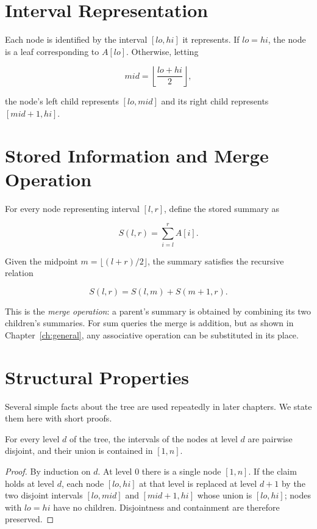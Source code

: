 \section{Interval Representation}
Each node is identified by the interval $[lo, hi]$ it represents. If $lo = hi$, the node is a leaf corresponding to $A[lo]$. Otherwise, letting

\begin{equation}
mid = \left\lfloor \frac{lo+hi}{2} \right\rfloor,
\end{equation}

the node's left child represents $[lo, mid]$ and its right child represents $[mid+1, hi]$.

\section{Stored Information and Merge Operation}
For every node representing interval $[l,r]$, define the stored summary as

\begin{equation}
S(l,r) = \sum_{i=l}^{r} A[i].
\end{equation}

Given the midpoint $m = \lfloor (l+r)/2 \rfloor$, the summary satisfies the recursive relation

\begin{equation}
S(l,r) = S(l,m) + S(m+1,r).
\label{eq:merge}
\end{equation}

This is the \emph{merge operation}: a parent's summary is obtained by combining its two children's summaries. For sum queries the merge is addition, but as shown in Chapter~\ref{ch:general}, any associative operation can be substituted in its place.

\section{Structural Properties}
Several simple facts about the tree are used repeatedly in later chapters. We state them here with short proofs.

\begin{lem}\label{lem:partition}
For every level $d$ of the tree, the intervals of the nodes at level $d$ are pairwise disjoint, and their union is contained in $[1,n]$.
\end{lem}
\begin{proof}
By induction on $d$. At level $0$ there is a single node $[1,n]$. If the claim holds at level $d$, each node $[lo,hi]$ at that level is replaced at level $d+1$ by the two disjoint intervals $[lo,mid]$ and $[mid+1,hi]$ whose union is $[lo,hi]$; nodes with $lo=hi$ have no children. Disjointness and containment are therefore preserved.
\end{proof}

